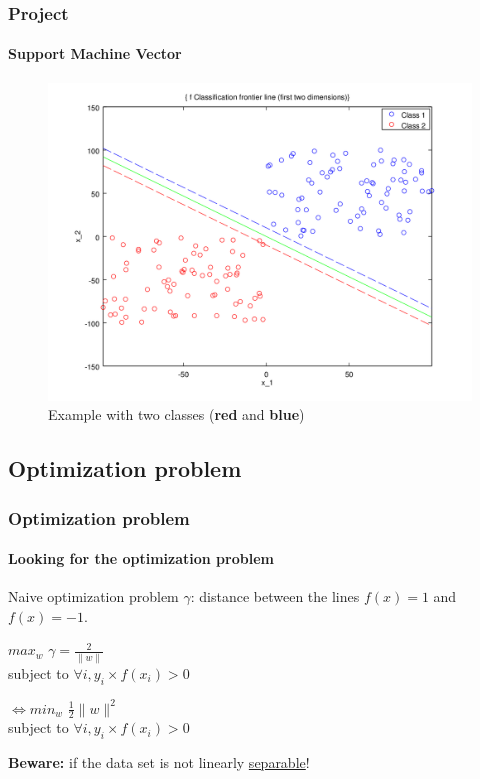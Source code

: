 \documentclass{beamer}
\begin{document}
\begin{frame}
\frametitle{Project}
\framesubtitle{\textbf{Support Machine Vector}}

         \begin{figure}
         \centering
         \caption{Example with two classes (\textbf{red} and \textbf{blue})}
         \includegraphics[scale=0.4]{images/voronoi.png}
         \end{figure}

\end{frame}

\subsection{Optimization problem}

\begin{frame}
\frametitle{Optimization problem}
\framesubtitle{Looking for the optimization problem}

\begin{block}{Naive optimization problem}
$\gamma$: distance between the lines $f(x) = 1$ and $f(x) = -1$.

\pause

      \begin{center}
        $max_{w}$ $\gamma = \frac{2}{\|w\|}$\\
        subject to $\forall i, y_i \times f(x_i) > 0$\\

\pause

       \bigskip
        $\Leftrightarrow min_{w}$ $\frac{1}{2} \|w\|^2$\\
        subject to $\forall i, y_i \times f(x_i) > 0$\\
      \end{center}

\end{block}

\textbf{Beware:} if the data set is not linearly \underline{separable}!

\end{frame}
\end{document}
